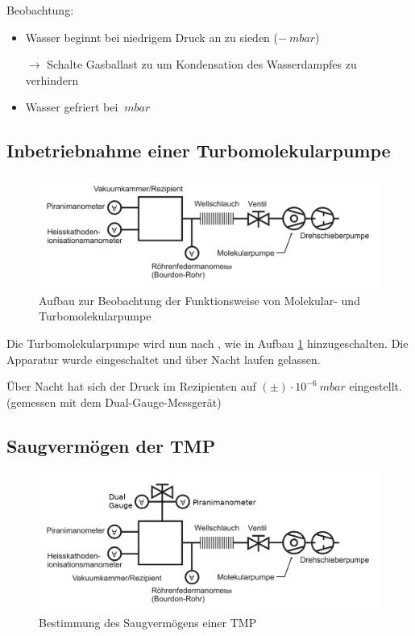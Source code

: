\documentclass[12pt, a4paper]{scrartcl}
\begin{document}
		Beobachtung:
		\begin{itemize}
			\item Wasser beginnt bei niedrigem Druck an zu sieden ($-\ mbar$)
			
			$\rightarrow$ Schalte Gasballast zu um Kondensation des Wasserdampfes zu verhindern			
			
			\item Wasser gefriert bei $\ mbar$
			
		\end{itemize}

	
	\subsection{Inbetriebnahme einer Turbomolekularpumpe}
	
        \begin{figure}[H]
            \centering
            \includegraphics[width=.55\paperwidth]{aufbau23}
            \caption{Aufbau zur Beobachtung der Funktionsweise von Molekular- und Turbomolekularpumpe}
            \label{fig:anord3}
        \end{figure}
    
    	Die Turbomolekularpumpe wird nun nach \cite{skript}, wie in Aufbau \ref{fig:anord3} hinzugeschalten. Die Apparatur wurde eingeschaltet und über Nacht laufen gelassen.
    	
    	Über Nacht hat sich der Druck im Rezipienten auf $(\pm)\cdot 10^{-6}\ mbar$ eingestellt. (gemessen mit dem Dual-Gauge-Messgerät)
    
    
    \subsection{Saugvermögen der TMP}
    
        \begin{figure}[H]
            \centering
            \includegraphics[width=.55\paperwidth]{aufbau24}
            \caption{Bestimmung des Saugvermögens einer TMP}
            \label{fig:anord4}
        \end{figure}
    
\end{document}
